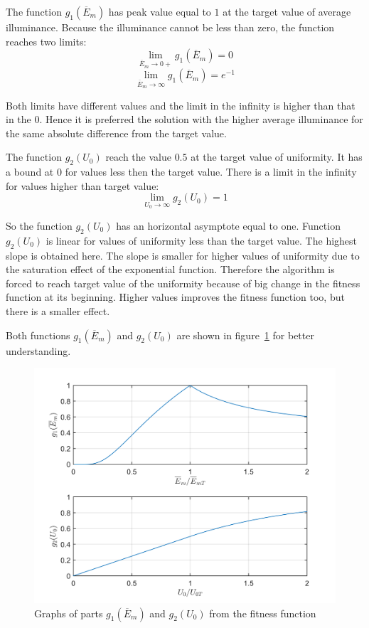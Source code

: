 The function $g_1\left(\overline{E}_{m}\right)$ has peak value equal to $1$ at the target value of average illuminance. Because the illuminance cannot be less than zero, the function reaches two limits:
\begin{equation}
\label{eq:g1lim0}
\lim_{\overline{E}_{m}\to 0+} g_1\left(\overline{E}_{m}\right) = 0
\end{equation}
\begin{equation}
\label{eq:g1limInf}
\lim_{\overline{E}_{m}\to \infty} g_1\left(\overline{E}_{m}\right) = e^{-1}
\end{equation}

Both limits have different values and the limit in the infinity is higher than that in the $0$. Hence it is preferred the solution with the higher average illuminance for the same absolute difference from the target value.

The function $g_2\left(U_{0}\right)$ reach the value $0.5$ at the target value of uniformity. It has a bound at $0$ for values less then the target value. There is a limit in the infinity for values higher than target value:
\begin{equation}
\label{eq:g2limInf}
\lim_{U_{0}\to \infty} g_2\left(U_{0}\right) = 1
\end{equation}

So the function $g_2\left(U_{0}\right)$ has an horizontal asymptote equal to one. Function $g_2\left(U_{0}\right)$ is linear for values of uniformity less than the target value. The highest slope is obtained here. The slope is  smaller for higher values of uniformity due to the saturation effect of the exponential function. Therefore the algorithm is forced to reach target value of the uniformity because of big change in the fitness function at its beginning. Higher values improves the fitness function too, but there is a smaller effect.

Both functions $g_1\left(\overline{E}_{m}\right)$ and $g_2\left(U_{0}\right)$ are shown in figure~\ref{fig:fitG1G2} for better understanding.

\begin{figure}[htb]
  \centering
  \includegraphics[width=\columnwidth]{obrG1G2}
  \caption{Graphs of parts $g_1\left(\overline{E}_{m}\right)$ and $g_2\left(U_0\right)$ from the fitness function}
  \label{fig:fitG1G2}
\end{figure}